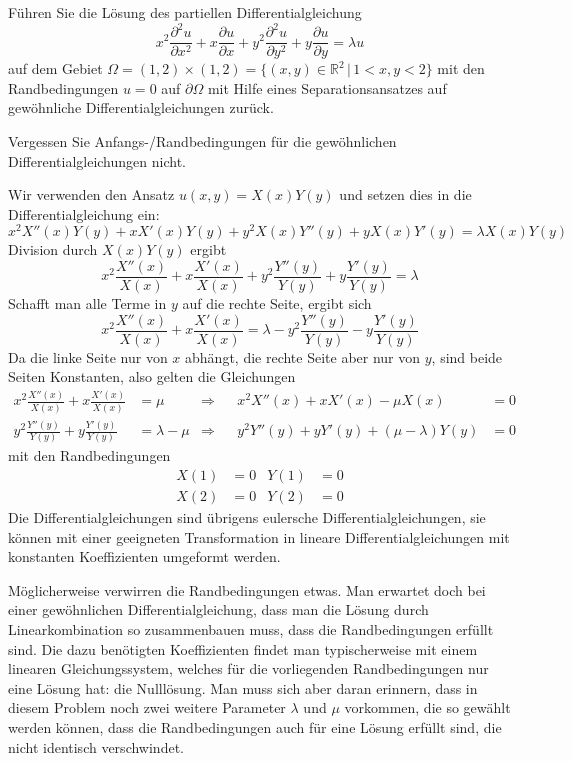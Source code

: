 Führen Sie die Lösung des partiellen Differentialgleichung
\[
x^2\frac{\partial^2 u}{\partial x^2}
+x\frac{\partial u}{\partial x}
+y^2\frac{\partial^2 u}{\partial y^2}
+y\frac{\partial u}{\partial y}
=\lambda u
\]
auf dem Gebiet
$\Omega=(1,2)\times(1,2)=\{ (x,y)\in\mathbb R^2\,|\, 1<x,y<2\}$
mit den Randbedingungen $u=0$ auf $\partial\Omega$
mit Hilfe eines Separationsansatzes auf gewöhnliche Differentialgleichungen
zurück.

\begin{hinweis}
Vergessen Sie Anfangs-/Randbedingungen für die gewöhnlichen
Differentialgleichungen nicht.
\end{hinweis}

\begin{loesung}
Wir verwenden den Ansatz $u(x,y)=X(x)Y(y)$ und setzen dies in die
Differentialgleichung ein:
\[
x^2X''(x)Y(y)
+xX'(x)Y(y)
+y^2X(x)Y''(y)
+yX(x)Y'(y)=\lambda X(x)Y(y)
\]
Division durch $X(x)Y(y)$ ergibt
\[
x^2\frac{X''(x)}{X(x)}
+x\frac{X'(x)}{X(x)}
+y^2\frac{Y''(y)}{Y(y)}
+y\frac{Y'(y)}{Y(y)}=\lambda
\]
Schafft man alle Terme in $y$ auf die rechte Seite, ergibt sich
\[
x^2\frac{X''(x)}{X(x)}
+x\frac{X'(x)}{X(x)}
=
\lambda
-y^2\frac{Y''(y)}{Y(y)}
-y\frac{Y'(y)}{Y(y)}
\]
Da die linke Seite nur von $x$ abhängt, die rechte Seite aber nur
von $y$, sind beide Seiten Konstanten, also gelten die
Gleichungen
\begin{align*}
x^2\frac{X''(x)}{X(x)}
+x\frac{X'(x)}{X(x)}&=\mu
&\Rightarrow&
&
x^2X''(x)+xX'(x)-\mu X(x)&=0
\\
y^2\frac{Y''(y)}{Y(y)}
+y\frac{Y'(y)}{Y(y)}&=\lambda-\mu
&\Rightarrow&
&
y^2Y''(y)+yY'(y)+(\mu-\lambda) Y(y)&=0
\end{align*}
mit den Randbedingungen
\begin{align*}
X(1)&=0&Y(1)&=0\\
X(2)&=0&Y(2)&=0
\end{align*}
Die Differentialgleichungen sind übrigens eulersche Differentialgleichungen,
sie können mit einer geeigneten Transformation in lineare
Differentialgleichungen mit konstanten Koeffizienten umgeformt werden.
\end{loesung}

\begin{diskussion}
Möglicherweise verwirren die Randbedingungen etwas.
Man erwartet doch bei einer gewöhnlichen Differentialgleichung, dass
man die Lösung durch Linearkombination so zusammenbauen muss, dass die
Randbedingungen erfüllt sind.
Die dazu benötigten Koeffizienten findet man typischerweise mit einem
linearen Gleichungssystem, welches für die vorliegenden Randbedingungen
nur eine Lösung hat: die Nulllösung.
Man muss sich aber daran erinnern, dass in diesem Problem noch zwei weitere
Parameter $\lambda$ und $\mu$ vorkommen, die so gewählt werden können,
dass die Randbedingungen auch für eine Lösung erfüllt sind, die nicht
identisch verschwindet.
\end{diskussion}

